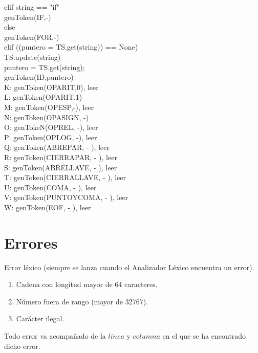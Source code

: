 \documentclass{article}
\begin{document}
\begin{flushleft}
   \qquad     elif string == "if"\\
     \qquad \quad       genToken(IF,-)\\
   \qquad     else\\
      \qquad \quad      genToken(FOR,-)\\
    \quad elif ((puntero = TS.get(string)) == None)\\
         \qquad  TS.update({string})\\
        \qquad    puntero = TS.get(string);\\
         \qquad    genToken(ID,puntero)\\
K: genToken(OPARIT,0), leer\\
L: genToken(OPARIT,1)\\
M: genToken(OPESP,-), leer\\
N: genToken(OPASIGN, -)\\
O: genTokeN(OPREL, -), leer\\
P: genToken(OPLOG, -), leer\\
Q: genToken(ABREPAR, - ), leer\\ 
R: genToken(CIERRAPAR, - ), leer\\
S: genToken(ABRELLAVE, - ), leer\\
T: genToken(CIERRALLAVE, - ), leer\\
U: genToken(COMA, - ), leer\\
V: genToken(PUNTOYCOMA, - ), leer\\
W: genToken(EOF, - ), leer\\
\end{flushleft}
\section{Errores}
Error léxico (siempre se lanza cuando el Analizador Léxico encuentra un error).
\begin{enumerate}
\item Cadena con longitud mayor de 64 caracteres.
\item Número fuera de rango (mayor de 32767).
\item Carácter ilegal. 
\end{enumerate}
Todo error va acompañado de la $linea$ y $columna$ en el que se ha encontrado dicho error.
\end{document}
